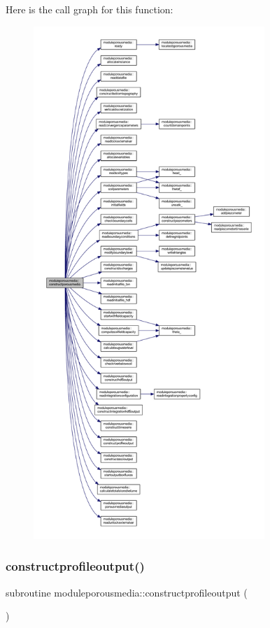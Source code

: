 Here is the call graph for this function\+:\nopagebreak
\begin{figure}[H]
\begin{center}
\leavevmode
\includegraphics[height=550pt]{namespacemoduleporousmedia_ac5974f908fab2510640dceca6afdc55e_cgraph}
\end{center}
\end{figure}
\mbox{\label{namespacemoduleporousmedia_a4c55632f6a1d6b5ff5769ca1ae4a1f74}} 
\subsubsection{\texorpdfstring{constructprofileoutput()}{constructprofileoutput()}}
{\footnotesize\ttfamily subroutine moduleporousmedia\+::constructprofileoutput (\begin{DoxyParamCaption}{ }\end{DoxyParamCaption})\hspace{0.3cm}{\ttfamily [private]}}

